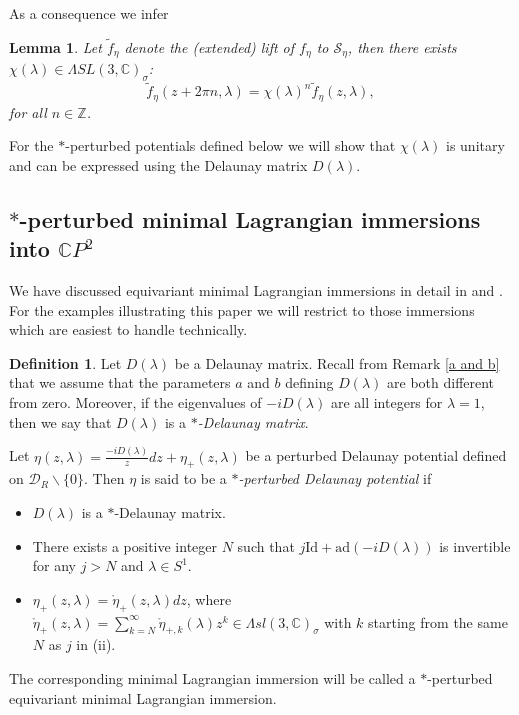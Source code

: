 \documentclass[a4paper,11pt]{amsart}
\newtheorem{lemma}[theorem]{Lemma}
\theoremstyle{definition}
\newtheorem{definition}{Definition}
\numberwithin{equation}{section}
\newcommand{\C}{\mathbb{C}}
\newcommand{\Z}{\mathbb{Z}}
\begin{document}
As a consequence we infer
\begin{lemma}
Let $\tilde{f}_{\eta}$ denote the (extended) lift of $f_{\eta}$ to $\mathcal{S}_{\eta}$, then there exists 
$\chi (\lambda) \in  \Lambda SL(3,\C)_{\sigma}$:
$$\tilde{f}_{\eta}(z+2\pi n, \lambda)=\chi(\lambda)^{n}  \tilde{f}_{\eta}(z,\lambda),$$
for all $n\in \Z$.
\end{lemma}

For the $*$-perturbed potentials defined below we will show that $\chi(\lambda)$ 
 is unitary and can be
expressed using the Delaunay matrix $D(\lambda)$.

\subsection{$*$-perturbed  minimal Lagrangian immersions into \texorpdfstring{$\C P^2$}{23}}

We have discussed equivariant minimal Lagrangian immersions in detail in  \cite{DoMaNL} and \cite{DoMaEX}. For the examples illustrating this paper we will restrict to those immersions which are easiest to handle technically. 

\begin{definition} \label{def:*-Delaunay} 
Let $D(\lambda)$ be a Delaunay matrix. Recall from Remark \ref{a and b}
that we assume that the parameters $a$ and $b$ defining $D(\lambda)$ are both different from zero.
Moreover, if the eigenvalues of $-iD(\lambda)$ are all integers for $\lambda=1$,
then we say that $D(\lambda)$ is a \emph{$*$-Delaunay matrix}.
 
 Let $\eta(z,\lambda) = \frac{-iD(\lambda)}{z}  dz + \eta_+(z,\lambda) $ be a perturbed Delaunay  potential defined on $\mathcal{D}_R\backslash \{0\}$.
Then $\eta$ is said to be  a \emph{$*$-perturbed Delaunay potential} if 
\begin{itemize}
\item[(i)] $D(\lambda)$ is a $*$-Delaunay matrix.
\item[(ii)] There exists a positive integer  $N$ such that $j\mathrm{Id}+\mathrm{ad}(-iD(\lambda))$ is invertible for any $j>N$ and $\lambda \in S^1$. 
\item[(iii)]  $\eta_+(z,\lambda)= \mathring{\eta}_+ (z,\lambda)dz$, where $\mathring{\eta}_+(z,\lambda)=
\sum_{k=N}^{\infty} \mathring{\eta}_{+,k}(\lambda)  z^k \in \Lambda sl(3,\mathbb{C})_{\sigma} $
 with $k$ starting from the same $N$ as $j$  in (ii). 
\end{itemize}
The corresponding minimal Lagrangian immersion will be called a $*$-perturbed equivariant minimal Lagrangian immersion.
\end{definition}
\end{document}

